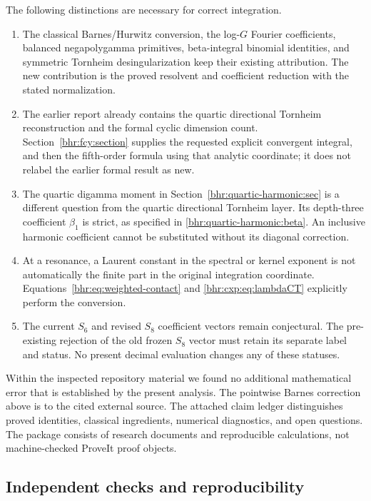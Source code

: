 \documentclass[11pt]{article}
\numberwithin{equation}{section}
\theoremstyle{plain}
\theoremstyle{definition}
\theoremstyle{remark}
\begin{document}
The following distinctions are necessary for correct integration.
\begin{enumerate}[leftmargin=*,itemsep=5pt]
 \item The classical Barnes/Hurwitz conversion, the log-$G$ Fourier
 coefficients, balanced negapolygamma primitives, beta-integral
 binomial identities, and symmetric Tornheim desingularization keep
 their existing attribution. The new contribution is the proved
 resolvent and coefficient reduction with the stated normalization.
 \item The earlier report already contains the quartic directional
 Tornheim reconstruction and the formal cyclic dimension count.
 Section~\ref{bhr:fcy:section} supplies the requested explicit convergent
 integral, and then the fifth-order formula using that analytic
 coordinate; it does not relabel the earlier formal result as new.
 \item The quartic digamma moment in
 Section~\ref{bhr:quartic-harmonic:sec} is a different question from
 the quartic directional Tornheim layer. Its depth-three coefficient
 $\beta_1$ is strict, as specified in
 \eqref{bhr:quartic-harmonic:beta}. An inclusive harmonic coefficient
 cannot be substituted without its diagonal correction.
 \item At a resonance, a Laurent constant in the spectral or kernel
 exponent is not automatically the finite part in the original
 integration coordinate. Equations~\eqref{bhr:eq:weighted-contact}
 and \eqref{bhr:cxp:eq:lambdaCT} explicitly perform the conversion.
 \item The current $S_6$ and revised $S_8$ coefficient vectors remain
 conjectural. The pre-existing rejection of the old frozen $S_8$
 vector must retain its separate label and status. No present
 decimal evaluation changes any of these statuses.
\end{enumerate}

Within the inspected repository material we found no additional
mathematical error that is established by the present analysis.
The pointwise Barnes correction above is to the cited external
source. The attached claim ledger distinguishes proved identities,
classical ingredients, numerical diagnostics, and open questions.
The package consists of research documents and reproducible
calculations, not machine-checked ProveIt proof objects.

\subsection{Independent checks and reproducibility}
\end{document}
